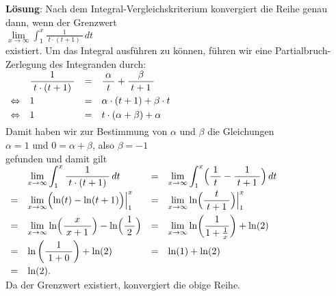 \documentclass{article}
\newcommand{\bruch}[2]{\displaystyle\frac{\;\displaystyle#1\;}{\;\displaystyle#2\;}}
\begin{document}
\noindent
\textbf{L\"osung}:  Nach dem Integral-Vergleichskriterium konvergiert die Reihe genau dann,
wenn der Grenzwert
\\[0.1cm]
\hspace*{1.3cm}
$\displaystyle \lim\limits_{x \rightarrow \infty} \int_1^x \bruch{1}{t\cdot(t+1)}\,dt$
\\[0.1cm]
existiert.  Um das Integral ausf\"uhren zu k\"onnen, f\"uhren wir eine Partialbruch-Zerlegung
des Integranden durch:
\\[0.1cm]
\hspace*{1.3cm}
$
\begin{array}[t]{llcl}
                & \bruch{1}{t\cdot(t+1)} & = & \bruch{\alpha}{t} + \bruch{\beta}{t+1} \\[0.3cm]
\Leftrightarrow & 1 & = & \alpha \cdot (t+1) + \beta \cdot t \\[0.1cm]
\Leftrightarrow & 1 & = & t\cdot (\alpha + \beta) + \alpha   \\[0.1cm]
\end{array}
$
\\[0.1cm]
Damit haben wir zur Bestimmung von $\alpha$ und $\beta$ die Gleichungen 
\\[0.1cm]
\hspace*{1.3cm}
$\alpha = 1$ \quad und \quad $0 = \alpha + \beta$, \quad also \quad $\beta = -1$
\\[0.1cm]
gefunden und damit gilt 
\\[0.1cm]
\hspace*{1.3cm}
$
\begin{array}[t]{clcl}
    & \displaystyle \lim\limits_{x \rightarrow \infty} \int_1^x \bruch{1}{t\cdot(t+1)}\,dt 
& = & \displaystyle \lim\limits_{x \rightarrow \infty} \int_1^x \Bigl(\bruch{1}{t} - \bruch{1}{t+1}\Bigr)\,dt \\[0.3cm]
  = & \displaystyle \lim\limits_{x \rightarrow \infty} \Bigl(\ln(t) - \ln(t+1)\Bigr)\Big|_1^x 
& = & \displaystyle \lim\limits_{x \rightarrow \infty} \ln\Bigl(\bruch{t}{t+1}\Bigr)\Big|_1^x \\[0.3cm]
  = & \displaystyle \lim\limits_{x \rightarrow \infty} \ln\Bigl(\bruch{x}{x+1}\Bigr) - \ln\Bigl(\bruch{1}{2}\Bigr)  
& = & \displaystyle \lim\limits_{x \rightarrow \infty} \ln\biggl(\frac{1}{1+\frac{1}{x}}\biggr) + \ln(2)  \\[0.3cm]
  = & \displaystyle \ln\left(\bruch{1}{1+0}\right) + \ln(2) 
& = & \displaystyle \ln(1) + \ln(2) \\[0.3cm]
  = & \ln(2).
\end{array}
$
\\[0.1cm]
Da der Grenzwert existiert, konvergiert die obige Reihe.
\pagebreak
\end{document}
